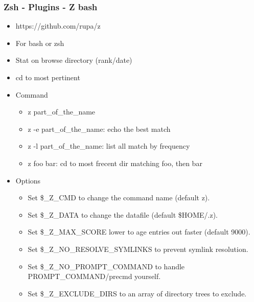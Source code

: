 \subsubsection{Zsh - Plugins - Z bash}
\begin{frame}[fragile]{\subsubsecname}
  \begin{itemize}
    \item https://github.com/rupa/z
    \item For bash or zsh
    \item Stat on browse directory (rank/date)
    \item cd to most pertinent
    \item Command
    \begin{itemize}
      \item z part\_of\_the\_name
      \item z -e part\_of\_the\_name: echo the best match
      \item z -l part\_of\_the\_name: list all match by frequency
      \item z foo bar: cd to most frecent dir matching foo, then bar
    \end{itemize}
    \item Options
    \begin{itemize}
      \item Set \$\_Z\_CMD to change the command name (default z).
      \item Set \$\_Z\_DATA to change the datafile (default \$HOME/.z).
      \item Set \$\_Z\_MAX\_SCORE  lower  to  age  entries  out faster (default 9000).
      \item Set \$\_Z\_NO\_RESOLVE\_SYMLINKS to prevent symlink resolution.
      \item Set \$\_Z\_NO\_PROMPT\_COMMAND to handle PROMPT\_COMMAND/precmd yourself.
      \item Set \$\_Z\_EXCLUDE\_DIRS to an array of directory trees to exclude.
    \end{itemize}
  \end{itemize}
\end{frame}

